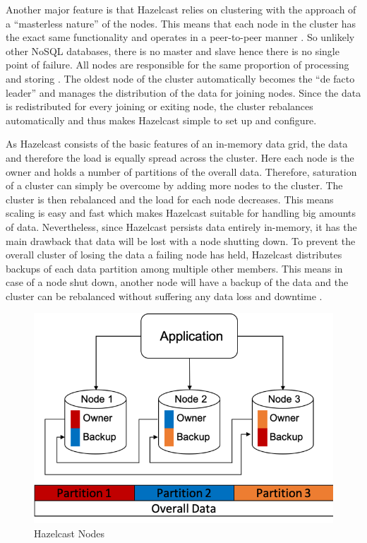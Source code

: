 Another major feature is that Hazelcast relies on clustering with the approach of a “masterless nature” of the nodes. This means that each node in the cluster has the exact same functionality and operates in a peer-to-peer manner \parencite{johns2015}. So unlikely other NoSQL databases, there is no master and slave hence there is no single point of failure. All nodes are responsible for the same proportion of processing and storing \parencite{hazelcastmanual}. The oldest node of the cluster automatically becomes the “de facto leader” and manages the distribution of the data for joining nodes. Since the data is redistributed for every joining or exiting node, the cluster rebalances automatically and thus makes Hazelcast simple to set up and configure.

As Hazelcast consists of the basic features of an in-memory data grid, the data and therefore the load is equally spread across the cluster. Here each node is the owner and holds a number of partitions of the overall data.
Therefore, saturation of a cluster can simply be overcome by adding more nodes to the cluster. The cluster is then rebalanced and the load for each node decreases. This means scaling is easy and fast which makes Hazelcast suitable for handling big amounts of data.
Nevertheless, since Hazelcast persists data entirely in-memory, it has the main drawback that data will be lost with a node shutting down. To prevent the overall cluster of losing the data a failing node has held, Hazelcast distributes backups of each data partition among multiple other members. This means in case of a node shut down, another node will have a backup of the data and the cluster can be rebalanced without suffering any data loss and downtime \parencite{johns2015}.
\begin{figure}[H]
    \centering
    \includegraphics[scale=0.6]{img/hazelcast-nodes.png}
    \caption{Hazelcast Nodes \parencite{johns2015}}
\end{figure}
